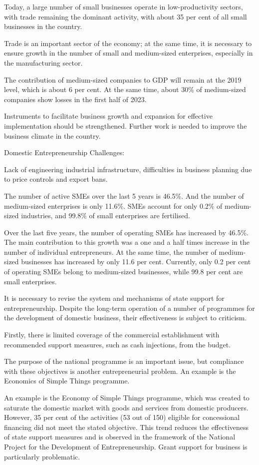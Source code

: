 \begin{multicols}{2}
Today, a large number of small businesses operate in low-productivity
sectors, with trade remaining the dominant activity, with about 35 per
cent of all small businesses in the country.

Trade is an important sector of the economy; at the same time, it is
necessary to ensure growth in the number of small and medium-sized
enterprises, especially in the manufacturing sector.

The contribution of medium-sized companies to GDP will remain at the
2019 level, which is about 6 per cent. At the same time, about 30\% of
medium-sized companies show losses in the first half of 2023.

Instruments to facilitate business growth and expansion for effective
implementation should be strengthened. Further work is needed to improve
the business climate in the country.

Domestic Entrepreneurship Challenges:

Lack of engineering industrial infrastructure, difficulties in business
planning due to price controls and export bans.

The number of active SMEs over the last 5 years is 46.5\%. And the
number of medium-sized enterprises is only 11.6\%. SMEs account for only
0.2\% of medium-sized industries, and 99.8\% of small enterprises are
fertilised.

Over the last five years, the number of operating SMEs has increased by
46.5\%. The main contribution to this growth was a one and a half times
increase in the number of individual entrepreneurs. At the same time,
the number of medium-sized businesses has increased by only 11.6 per
cent. Currently, only 0.2 per cent of operating SMEs belong to
medium-sized businesses, while 99.8 per cent are small enterprises.

It is necessary to revise the system and mechanisms of state support for
entrepreneurship. Despite the long-term operation of a number of
programmes for the development of domestic business, their effectiveness
is subject to criticism.

Firstly, there is limited coverage of the commercial establishment with
recommended support measures, such as cash injections, from the budget.

The purpose of the national programme is an important issue, but
compliance with these objectives is another entrepreneurial problem. An
example is the Economics of Simple Things programme.

An example is the Economy of Simple Things programme, which was created
to saturate the domestic market with goods and services from domestic
producers. However, 35 per cent of the activities (53 out of 150)
eligible for concessional financing did not meet the stated objective.
This trend reduces the effectiveness of state support measures and is
observed in the framework of the National Project for the Development of
Entrepreneurship. Grant support for business is particularly
problematic.


\end{multicols}
